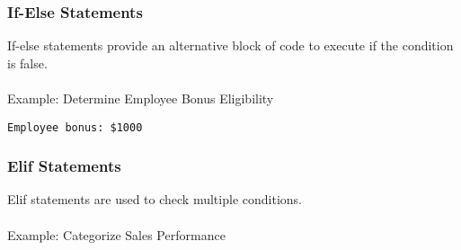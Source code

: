 \documentclass[
  letterpaper,
  DIV=11,
  numbers=noendperiod]{scrreprt}
\makeatletter
\let\oldparagraph\paragraph
\renewcommand{\paragraph}{
    \@ifstar
      \xxxParagraphStar
      \xxxParagraphNoStar
  }
\newcommand{\xxxParagraphStar}[1]{\oldparagraph*{#1}\mbox{}}
\newcommand{\xxxParagraphNoStar}[1]{\oldparagraph{#1}\mbox{}}
\newenvironment{Shaded}{\begin{snugshade}}{\end{snugshade}}
\newcommand{\BuiltInTok}[1]{\textcolor[rgb]{0.00,0.23,0.31}{#1}}
\newcommand{\ControlFlowTok}[1]{\textcolor[rgb]{0.00,0.23,0.31}{\textbf{#1}}}
\newcommand{\DecValTok}[1]{\textcolor[rgb]{0.68,0.00,0.00}{#1}}
\newcommand{\NormalTok}[1]{\textcolor[rgb]{0.00,0.23,0.31}{#1}}
\newcommand{\OperatorTok}[1]{\textcolor[rgb]{0.37,0.37,0.37}{#1}}
\newcommand{\SpecialCharTok}[1]{\textcolor[rgb]{0.37,0.37,0.37}{#1}}
\newcommand{\SpecialStringTok}[1]{\textcolor[rgb]{0.13,0.47,0.30}{#1}}
\newcommand{\StringTok}[1]{\textcolor[rgb]{0.13,0.47,0.30}{#1}}
\makeatother
\begin{document}
\subsubsection{If-Else Statements}\label{if-else-statements}

If-else statements provide an alternative block of code to execute if
the condition is false.

\paragraph{Example: Determine Employee Bonus
Eligibility}\label{example-determine-employee-bonus-eligibility}

\begin{Shaded}
\end{Shaded}

\begin{verbatim}
Employee bonus: $1000
\end{verbatim}

\subsubsection{Elif Statements}\label{elif-statements}

Elif statements are used to check multiple conditions.

\paragraph{Example: Categorize Sales
Performance}\label{example-categorize-sales-performance}
\end{document}

